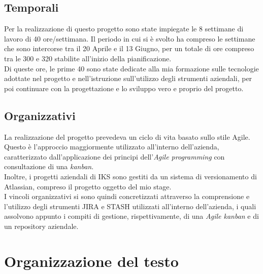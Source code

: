 \subsection{Temporali}
Per la realizzazione di questo progetto sono state impiegate le 8 settimane di lavoro di 40 ore/settimana. Il periodo in cui si è svolto ha compreso le settimane che sono intercorse tra il 20 Aprile e il 13 Giugno, per un totale di ore compreso tra le 300 e 320 stabilite all'inizio della pianificazione.\\
Di queste ore, le prime 40 sono state dedicate alla mia formazione sulle tecnologie adottate nel progetto e nell'istruzione sull'utilizzo degli strumenti aziendali, per poi continuare con la progettazione e lo sviluppo vero e proprio del progetto.

\subsection{Organizzativi}
La realizzazione del progetto prevedeva un ciclo di vita basato sullo stile Agile. Questo è l'approccio maggiormente utilizzato all'interno dell'azienda, caratterizzato dall'applicazione dei principi dell'\emph{Agile programming} con consultazione di una \emph{kanban}.\\
Inoltre, i progetti aziendali di IKS sono gestiti da un sistema di versionamento di Atlassian, compreso il progetto oggetto del mio stage.\\
I vincoli organizzativi si sono quindi concretizzati attraverso la comprensione e l'utilizzo degli strumenti JIRA e STASH utilizzati all'interno dell'azienda, i quali assolvono appunto i compiti di gestione, rispettivamente, di una \emph{Agile kanban} e di un repository aziendale.



\section{Organizzazione del testo}

%    
%    
%    
%    
%    

